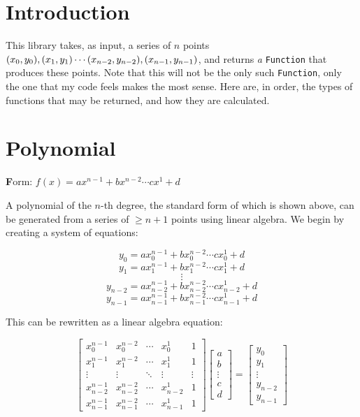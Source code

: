 \documentclass[12pt, letterpaper]{article}
\author{Liam Bloom}
\date{January 14, 2021}
\begin{document}
\maketitle

\section*{Introduction}

This library takes, as input, a series of $n$ points 
\((x_0, y_0), (x_1, y_1)\cdots \\ (x_{n-2}, y_{n-2}), 
(x_{n-1}, y_{n-1})\), and returns {\textit a} \verb|Function| that 
produces these points. Note that this will not be the only such
\verb|Function|, only the one that my code feels makes the most sense. 
Here are, in order, the types of functions that may be returned, and
how they are calculated.

\section{Polynomial}

{\textbf Form:} \(f(x)=ax^{n-1}+bx^{n-2}\cdots cx^1+d\) \vspace{2ex}

A polynomial of the $n$-th degree, the standard form of which is shown
above, can be generated from a series of $\geq n+1$ points using linear
algebra. We begin by creating a system of equations:

\[y_0=ax_0^{n-1}+bx_0^{n-2}\cdots cx_0^1+d\]
\[y_1=ax_1^{n-1}+bx_1^{n-2}\cdots cx_1^1+d\]
\[\vdots\]
\[y_{n-2}=ax_{n-2}^{n-1}+bx_{n-2}^{n-2}\cdots cx_{n-2}^1+d\]
\[y_{n-1}=ax_{n-1}^{n-1}+bx_{n-1}^{n-2}\cdots cx_{n-1}^1+d\]

This can be rewritten as a linear algebra equation:


\[
    \begin{bmatrix} 
    x_0^{n-1} & x_0^{n-2} & \cdots & x_0^1 & 1 \\
    x_1^{n-1} & x_1^{n-2} & \cdots & x_1^1 & 1 \\
    \vdots & \vdots & \ddots & \vdots & \vdots \\
    x_{n-2}^{n-1} & x_{n-2}^{n-2} & \cdots & x_{n-2}^1 & 1 \\
    x_{n-1}^{n-1} & x_{n-1}^{n-2} & \cdots & x_{n-1}^1 & 1
    \end{bmatrix}
    \begin{bmatrix}
    a \\
    b \\
    \vdots \\
    c \\
    d
    \end{bmatrix}
    =
    \begin{bmatrix}
    y_0 \\
    y_1 \\
    \vdots \\
    y_{n-2} \\
    y_{n-1}
    \end{bmatrix}
\]
\end{document}
